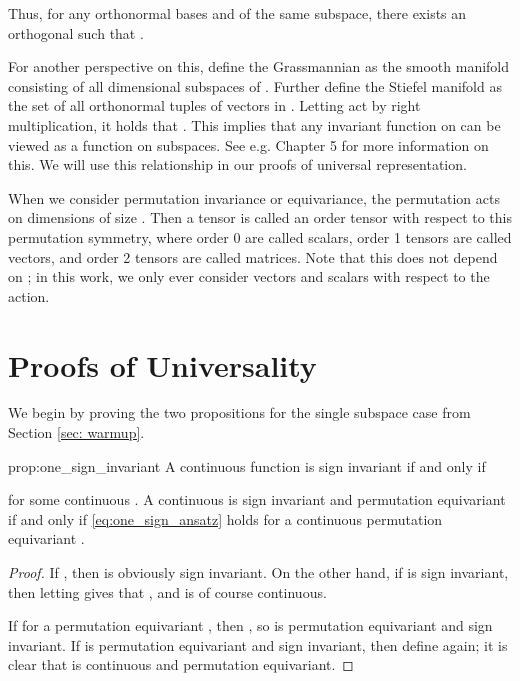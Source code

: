 \documentclass{article} \usepackage{iclr2023_conference,times}
\begin{document}
 Thus, for any orthonormal bases  and  of the same subspace, there exists an orthogonal  such that .

For another perspective on this, define the Grassmannian  as the smooth manifold consisting of all  dimensional subspaces of . Further define the Stiefel manifold  as the set of all orthonormal tuples  of  vectors in . Letting  act by right multiplication, it holds that . This implies that any  invariant function on  can be viewed as a function on subspaces. See e.g. \cite{gallier2020differential} Chapter 5 for more information on this. We will use this relationship in our proofs of universal representation.


When we consider permutation invariance or equivariance, the permutation acts on dimensions of size . Then a tensor  is called an order  tensor with respect to this permutation symmetry, where order 0 are called scalars, order 1 tensors are called vectors, and order 2 tensors are called matrices. Note that this does not depend on ; in this work, we only ever consider vectors and scalars with respect to the  action.


\section{Proofs of Universality}


We begin by proving the two propositions for the single subspace case from Section \ref{sec: warmup}.

\begin{repproposition}{prop:one_sign_invariant}
    A continuous function  is sign invariant if and only if
    
    for some continuous . A continuous  is sign invariant and permutation equivariant if and only if \eqref{eq:one_sign_ansatz} holds for a continuous permutation equivariant .
\end{repproposition}



\begin{proof}
    If , then  is obviously sign invariant. On the other hand, if  is sign invariant, then letting  gives that , and  is of course continuous.

    If  for a permutation equivariant , then , so  is permutation equivariant and sign invariant. If  is permutation equivariant and sign invariant, then define  again; it is clear that  is continuous and permutation equivariant.
\end{proof}
\end{document}
